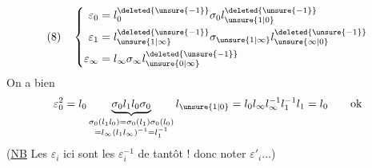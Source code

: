 \[
(8)\quad\left\{\begin{aligned}
\varepsilon_0&=l_0^{\deleted{\unsure{-1}}}\sigma_0l_{\unsure{1|0}}^{\deleted{\unsure{-1}}}\\
\varepsilon_1&=l_{\unsure{1|\infty}}^{\deleted{\unsure{-1}}}\sigma_{\unsure{1|\infty}}l_{\unsure{\infty|0}}^{\deleted{\unsure{-1}}}\\
\varepsilon_\infty&=l_\infty\sigma_\infty l_{\unsure{0|\infty}}^{\deleted{\unsure{-1}}}
\end{aligned}\right.
\]
On a bien
\[
\varepsilon_0^2=l_0\underbrace{\sigma_0l_1l_0\sigma_0}_{\substack{\sigma_0(l_1l_0)=\sigma_0(l_1)\sigma_0(l_0)\\=l_\infty(l_1l_\infty)^{-1}=l_1^{-1}}}l_{\unsure{1|0}}=l_0l_\infty l_\infty^{-1}l_1^{-1}l_1=l_0\qquad\text{ok}
\]
(\uline{NB} Les $\varepsilon_i$ ici sont les $\varepsilon_i^{-1}$ de tantôt !    donc noter $\varepsilon'_i\ldots$)

